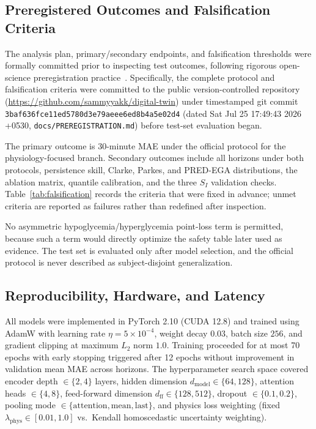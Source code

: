 \documentclass[journal]{IEEEtran}
\begin{document}
\subsection{Preregistered Outcomes and Falsification Criteria}

The analysis plan, primary/secondary endpoints, and falsification thresholds were formally committed prior to inspecting test outcomes, following rigorous open-science preregistration practice~\cite{ref79}. Specifically, the complete protocol and falsification criteria were committed to the public version-controlled repository (\url{https://github.com/sammyyakk/digital-twin}) under timestamped git commit \texttt{3baf636fce11ed5780d3e79aeee6ed8b4a5e02d4} (dated Sat Jul 25 17:49:43 2026 +0530, \texttt{docs/PREREGISTRATION.md}) before test-set evaluation began.

The primary outcome is 30-minute MAE under the official protocol for the physiology-focused branch. Secondary outcomes include all horizons under both protocols, persistence skill, Clarke, Parkes, and PRED-EGA distributions, the ablation matrix, quantile calibration, and the three $S_I$ validation checks. Table~\ref{tab:falsification} records the criteria that were fixed in advance; unmet criteria are reported as failures rather than redefined after inspection.

No asymmetric hypoglycemia/hyperglycemia point-loss term is permitted, because such a term would directly optimize the safety table later used as evidence. The test set is evaluated only after model selection, and the official protocol is never described as subject-disjoint generalization.

\subsection{Reproducibility, Hardware, and Latency}

All models were implemented in PyTorch 2.10 (CUDA 12.8) and trained using AdamW with learning rate $\eta = 5 \times 10^{-4}$, weight decay $0.03$, batch size $256$, and gradient clipping at maximum $L_2$ norm $1.0$. Training proceeded for at most 70 epochs with early stopping triggered after 12 epochs without improvement in validation mean MAE across horizons. The hyperparameter search space covered encoder depth $\in \{2, 4\}$ layers, hidden dimension $d_{\text{model}} \in \{64, 128\}$, attention heads $\in \{4, 8\}$, feed-forward dimension $d_{\text{ff}} \in \{128, 512\}$, dropout $\in \{0.1, 0.2\}$, pooling mode $\in \{\text{attention}, \text{mean}, \text{last}\}$, and physics loss weighting (fixed $\lambda_{\text{phys}} \in [0.01, 1.0]$ vs.\ Kendall homoscedastic uncertainty weighting).
\end{document}
